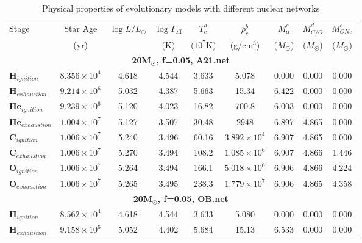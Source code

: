 \begin{table}[h]
    \centering
    \caption{Physical properties of evolutionary models with different nuclear networks}
    \begin{tabular}{lcccccccc}
        \toprule
        Stage & \multicolumn{1}{c}{Star Age} & \multicolumn{1}{c}{$\log L / L_{\odot}$} & \multicolumn{1}{c}{$\log T_{\text{eff}}$} & \multicolumn{1}{c}{$T_c^a$} & \multicolumn{1}{c}{$\rho_c^b$} & \multicolumn{1}{c}{$M_{\alpha}^c$} & \multicolumn{1}{c}{$M_{C/O}^d$} & \multicolumn{1}{c}{$M_{ONe}^e$} \\
        & (yr) &  & (K) & ($10^7$K) & (g/cm$^3$) & ($M_{\odot}$) & ($M_{\odot}$) & ($M_{\odot}$) \\
        \midrule
        \multicolumn{9}{c}{\textbf{20M$_\odot$, f=0.05, A21.net}} \\
        \midrule
        \textbf{H$_{ignition}$} & $8.356 \times 10^4$ & 4.618 & 4.544 & 3.633  & 5.078 & 0.000 & 0.000 & 0.000  \\
        \textbf{H$_{exhaustion}$} & $9.214 \times 10^6$ & 5.032 & 4.387 & 5.663  & 15.34 & 6.422 & 0.000 & 0.000  \\
        \textbf{He$_{ignition}$} & $9.239 \times 10^6$ & 5.120 & 4.023 & 16.82  & 700.8 & 6.003 & 0.000 & 0.000  \\
        \textbf{He$_{exhaustion}$} & $1.004 \times 10^7$ & 5.127 & 3.507 & 30.48  & 2948 & 6.897 & 4.865 & 0.000  \\
        \textbf{C$_{ignition}$} & $1.006 \times 10^7$  & 5.240 & 3.496 & 60.16  & $3.892 \times 10^4$ & 6.907 & 4.865 & 0.000  \\
        \textbf{C$_{exhaustion}$} & $1.006 \times 10^7$  & 5.270 & 3.494 & 108.2  & $1.085 \times 10^6$ & 6.907  & 4.866  & 1.446  \\
        \textbf{O$_{ignition}$} & $1.006 \times 10^7$  & 5.264 & 3.494 & 166.1  & $5.018 \times 10^6$ & 6.906  & 4.866  & 4.224  \\
        \textbf{O$_{exhaustion}$} & $1.006 \times 10^7$  & 5.265 & 3.495 & 238.3  & $1.779 \times 10^7$ & 6.906  & 4.865  & 4.358  \\
	\midrule
	\multicolumn{9}{c}{\textbf{20M$_\odot$, f=0.05, OB.net}} \\
	\midrule
        \textbf{H$_{ignition}$} & $8.562 \times 10^4$  & 4.618 & 4.544 & 3.633  & 5.080 & 0.000  & 0.000  & 0.000  \\
        \textbf{H$_{exhaustion}$} & $9.158 \times 10^6$  & 5.052 & 4.402 & 5.684  & 15.13 & 6.533  & 0.000  & 0.000  \\

\end{tabular}
\end{table}

